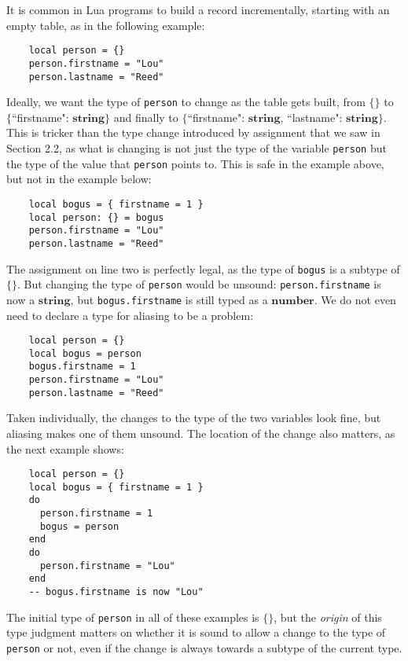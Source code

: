 \documentclass[preprint]{sig-alternate}
\newcommand{\Number}{\mathbf{number}}
\newcommand{\String}{\mathbf{string}}
\begin{document}
It is common in Lua programs to build a record incrementally,
starting with an empty table, as in the following example:

\begin{verbatim}
    local person = {}
    person.firstname = "Lou"
    person.lastname = "Reed"
\end{verbatim}

Ideally, we want the type of {\tt person} to change as the
table gets built, from $\{\}$ to $\{$``firstname": $\String\}$
and finally to $\{$``firstname": $\String$, ``lastname":
 $\String\}$. This is tricker than the type change introduced
by assignment that we saw in Section 2.2, as what is changing
is not just the type of the variable {\tt person} but the
type of the value that {\tt person} points to. This is safe
in the example above, but not in the example below:

\begin{verbatim}
    local bogus = { firstname = 1 }
    local person: {} = bogus
    person.firstname = "Lou"
    person.lastname = "Reed"
\end{verbatim}

The assignment on line two is perfectly legal, as the type
of {\tt bogus} is a subtype of $\{\}$. But changing the type
of {\tt person} would be unsound: {\tt person.firstname} is
now a $\String$, but {\tt bogus.firstname} is still typed
as a $\Number$. We do not even need to declare a type for
aliasing to be a problem: 

\begin{verbatim}
    local person = {}
    local bogus = person
    bogus.firstname = 1
    person.firstname = "Lou"
    person.lastname = "Reed"
\end{verbatim}

Taken individually, the changes to the type of the two
variables look fine, but aliasing makes one of them unsound.
The location of the change also matters, as the next example
shows:

\begin{verbatim}
    local person = {}
    local bogus = { firstname = 1 }
    do
      person.firstname = 1
      bogus = person
    end
    do
      person.firstname = "Lou"
    end
    -- bogus.firstname is now "Lou"
\end{verbatim}

The initial type of {\tt person} in all of these examples is
$\{\}$, but the {\em origin} of this type judgment matters
on whether it is sound to allow a change to the type of
{\tt person} or not, even if the change is always towards
a subtype of the current type.
\end{document}
